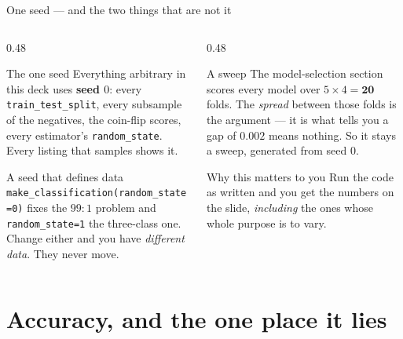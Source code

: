 \documentclass[aspectratio=169]{beamer}
\begin{document}
\begin{frame}[shrink=6]{One seed --- and the two things that are not it}
  \begin{columns}[T]
    \begin{column}{0.48\textwidth}
      \begin{block}{The one seed}
        \small Everything arbitrary in this deck uses \textbf{seed $0$}:
        every \texttt{train\_test\_split}, every subsample of the negatives,
        the coin-flip scores, every estimator's \texttt{random\_state}.
        Every listing that samples shows it.
      \end{block}
      \begin{alertblock}{A seed that defines data}
        \small \texttt{make\_classification(random\_state=0)} fixes the
        $99\!:\!1$ problem and \texttt{random\_state=1} the three-class one.
        Change either and you have \emph{different data}. They never move.
      \end{alertblock}
    \end{column}
    \begin{column}{0.48\textwidth}
      \begin{block}{A sweep}
        \small The model-selection section scores every model over
        $5 \times 4 = \mathbf{20}$ folds. The \emph{spread} between those
        folds is the argument --- it is what tells you a gap of $0.002$ means
        nothing. So it stays a sweep, generated from seed $0$.
      \end{block}
      \begin{exampleblock}{Why this matters to you}
        \small Run the code as written and you get the numbers on the slide,
        \emph{including} the ones whose whole purpose is to vary.
      \end{exampleblock}
    \end{column}
  \end{columns}
\end{frame}

\section[Accuracy]{Accuracy, and the one place it lies}
\label{sec:whynot}
\end{document}
